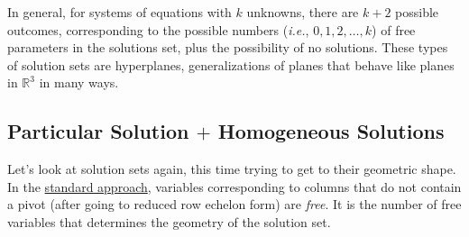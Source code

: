 In general, for systems of equations with $k$ unknowns, there are $k+2$ possible outcomes, corresponding to the possible numbers ({\itshape i.e.}, $0,1,2,\dots,k$) of free parameters in the solutions set, plus the possibility of no solutions.  These types of solution sets are hyperplanes, generalizations of planes that behave like planes in $\mathbb{R}^3$ in many ways.









\subsection{\! Particular Solution \hspace{-.7mm}$+$\hspace{-.7mm} Homogeneous Solutions }

Let's look at solution sets again, this time trying to get to their geometric shape.
In the \hyperlink{standard approach}{standard approach}, variables corresponding to columns that do not contain a pivot (after going to reduced row echelon form) are \emph{free}.  It is the number of free variables that determines the geometry of the solution set. 

